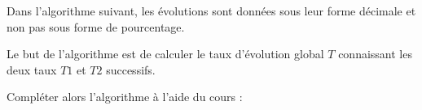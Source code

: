 \documentclass[10pt,openright,twoside,french]{book}
\begin{document}

Dans l'algorithme suivant, les évolutions sont données sous leur forme décimale et non pas sous forme de pourcentage.\par
Le but de l'algorithme est de calculer le taux d'évolution global $T$ connaissant les deux taux $T1$ et $T2$ successifs.\par\medskip

Compléter alors l'algorithme à l'aide du cours :

\begin{center}
\small
\end{center}
\end{document}
